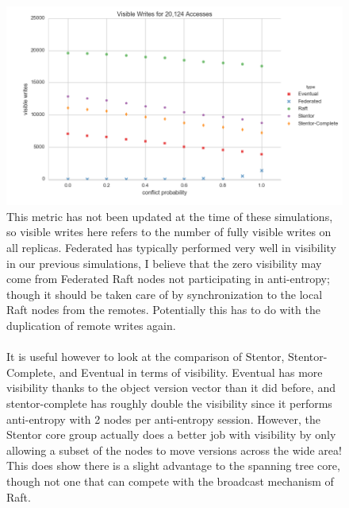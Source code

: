 \documentclass[11pt,letterpaper]{article}
\begin{document}
\begin{figure}[!h]
    \centering
        \includegraphics[width=\textwidth]{figures/visible_writes.png}
        \caption{\textsf{This metric has not been updated at the time of these simulations, so visible writes here refers to the number of fully visible writes on all replicas. Federated has typically performed very well in visibility in our previous simulations, I believe that the zero visibility may come from Federated Raft nodes not participating in anti-entropy; though it should be taken care of by synchronization to the local Raft nodes from the remotes. Potentially this has to do with the duplication of remote writes again.\\
\\
        It is useful however to look at the comparison of Stentor, Stentor-Complete, and Eventual in terms of visibility. Eventual has more visibility thanks to the object version vector than it did before, and stentor-complete has roughly double the visibility since it performs anti-entropy with 2 nodes per anti-entropy session. However, the Stentor core group actually does a better job with visibility by only allowing a subset of the nodes to move versions across the wide area! This does show there is a slight advantage to the spanning tree core, though not one that can compete with the broadcast mechanism of Raft.}}
        \label{fig:visible_writes}
\end{figure}
\end{document}
